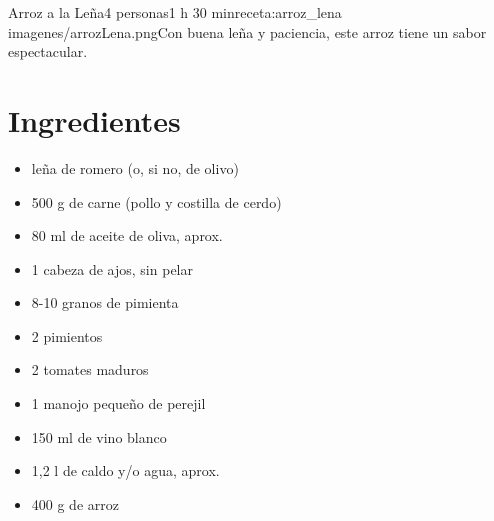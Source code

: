 \begin{recetaConImagen}{Arroz a la Leña}{4 personas}{1 h 30 min}{receta:arroz_lena}
    {imagenes/arrozLena.png}{Con buena leña y paciencia, este arroz tiene un sabor espectacular.}


    \begin{minipage}[t]{0.35\textwidth}
        \section*{Ingredientes}
        \begin{itemize}[leftmargin=*, itemsep=2pt, topsep=2pt]
            \item leña de romero (o, si no, de olivo)
            \item 500 g de carne (pollo y costilla de cerdo)
            \item 80 ml de aceite de oliva, aprox.
            \item 1 cabeza de ajos, sin pelar
            \item 8-10 granos de pimienta
            \item 2 pimientos
            \item 2 tomates maduros
            \item 1 manojo pequeño de perejil
            \item 150 ml de vino blanco
            \item 1,2 l de caldo y/o agua, aprox.
            \item 400 g de arroz
        \end{itemize}
    \end{minipage}
    \hfill
    \begin{minipage}[t]{0.6\textwidth}

\end{minipage}
\end{recetaConImagen}
